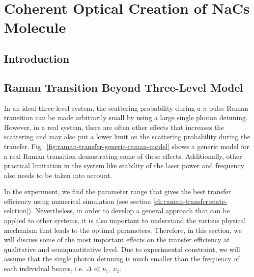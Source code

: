 
\chapter{Coherent Optical Creation of NaCs Molecule}
\label{ch:raman-transfer}

\section{Introduction}


\section{Raman Transition Beyond Three-Level Model}

In an ideal three-level system, the scattering probability during a $\pi$ pulse
Raman transition can be made arbitrarily small by using a large single photon detuning.
However, in a real system, there are often other effects that increases the scattering
and may also put a lower limit on the scattering probability during the transfer.
Fig.~\ref{fig:raman-transfer-generic-raman-model} shows a generic model
for a real Raman transition demostrating some of these effects.
Additionally, other practical limitation in the system like stability of the laser power
and frequency also needs to be taken into account.

In the experiment, we find the parameter range that gives the best transfer efficiency
using numerical simulation (see section \ref{ch:raman-transfer:state-selction}).
Nevertheless, in order to develop a general approach that can be applied to other systems,
it is also important to understand the various physical mechanism that leads
to the optimal parameters.
Therefore, in this section, we will discuss some of the most important effects
on the transfer efficiency at qualitative and semiquantitative level.
Due to experimental constraint, we will assume that the single photon detuning is
much smaller than the frequency of each individual beams, i.e. $\Delta\ll\nu_1,\ \nu_2$.

